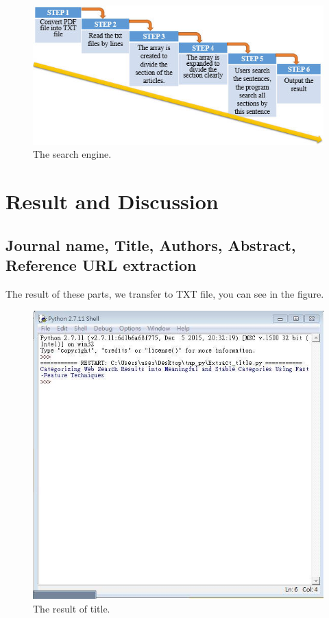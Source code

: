 \begin{figure}[tbh]
	\begin{center}
		\includegraphics[width=\columnwidth]{Union_Method_Chart_Search engine}
	\end{center}
	\caption{The search engine.}
	\end{figure}
	
\section*{Result and Discussion}
	\subsection*{Journal name, Title, Authors, Abstract, Reference URL extraction}
	The result of these parts, we transfer to TXT file, you can see in the figure.

	\begin{figure}[tbh]
		\begin{center}
			\includegraphics[width=\columnwidth]{Union_Result_Chart_Title}
		\end{center}
		\caption{The result of title.}
	\end{figure}
	
